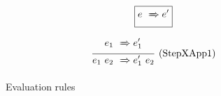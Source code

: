 
\begin{figure*}

$$
\boxed{e ~\xRightarrow~ e'}
$$

$$
\frac {\displaystyle 
    e_1 ~\xRightarrow~ e_1'
} {\displaystyle 
    e_1~e_2 ~\xRightarrow~ e_1'~e_2
} \ 
\textrm{(StepXApp1)}
$$


\caption{Evaluation rules}
\label{fig:source:eval}
\end{figure*}


